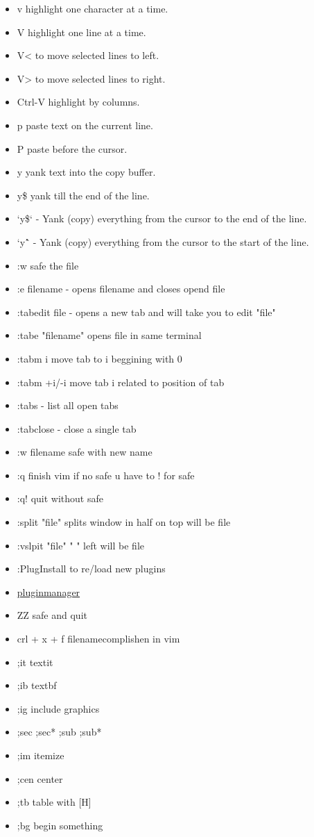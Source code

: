 \documentclass[12pt]{article}
\begin{document}
\begin{itemize}
    \item v highlight one character at a time.
    \item V highlight one line at a time.
    \item V< to move selected lines to left.
    \item V> to move selected lines to right.
    \item Ctrl-V highlight by columns.
    \item p paste text on the current line.
    \item P paste before the cursor.
    \item y yank text into the copy buffer.
    \item y\$ yank till the end of the line.
    \item `y\$` - Yank (copy) everything from the cursor to the end of the line.
    \item `y\^` - Yank (copy) everything from the cursor to the start of the line.\\

    \item :w  safe the file
    \item :e filename - opens filename and closes opend file
    \item :tabedit file - opens a new tab and will take you to edit "file"
    \item :tabe "filename" opens file in same terminal 
    \item :tabm i move tab to i beggining with 0
    \item :tabm +i/-i move tab i related to position of tab
    \item :tabs - list all open tabs
    \item :tabclose - close a single tab
    \item :w filename safe with new name
    \item :q finish vim if no safe u have to ! for safe
    \item :q! quit without safe
    \item :split "file" splits window in half on top will be file
    \item :vslpit "file" "                      " left will be file
    \item :PlugInstall to re/load new plugins
    \item \href{https://github.com/junegunn/vim-plug}{pluginmanager}

    \item ZZ safe and quit
    \item crl + x + f filenamecomplishen in vim
    \item ;it textit{}
    \item ;ib textbf{}
    \item ;ig include graphics
    \item ;sec ;sec* ;sub ;sub*
    \item ;im itemize
    \item ;cen center
    \item ;tb table with [H]
    \item ;bg begin something


\end{itemize}
\end{document}
